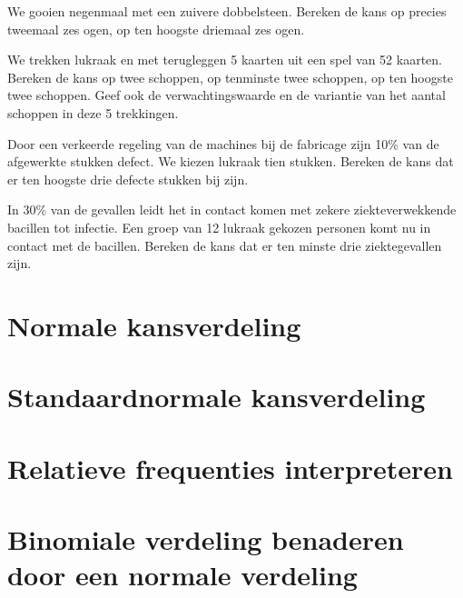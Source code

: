 \documentclass[12pt,twoside]{article}
\begin{document}
\begin{oefening}
We gooien negenmaal met een zuivere dobbelsteen. Bereken de kans op precies tweemaal zes ogen, op ten hoogste driemaal zes ogen.
\end{oefening}

\begin{oefening}
We trekken lukraak en met terugleggen 5 kaarten uit een spel van 52 kaarten. Bereken de kans op twee schoppen, op tenminste twee schoppen, op ten hoogste twee schoppen. Geef ook de verwachtingswaarde en de variantie van het aantal schoppen in deze 5 trekkingen.
\end{oefening}

\begin{oefening}
Door een verkeerde regeling van de machines bij de fabricage zijn 10\% van de afgewerkte stukken defect. We kiezen lukraak tien stukken. Bereken de kans dat er ten hoogste drie defecte stukken bij zijn.
\end{oefening}

\begin{oefening}
In 30\% van de gevallen leidt het in contact komen met zekere ziekteverwekkende bacillen tot infectie. Een groep van 12 lukraak gekozen personen komt nu in contact met de bacillen. Bereken de kans dat er ten minste drie ziektegevallen zijn.
\end{oefening}

\pagebreak
\section{Normale kansverdeling}

\section{Standaardnormale kansverdeling}

\section{Relatieve frequenties interpreteren}

\section{Binomiale verdeling benaderen door een normale verdeling}



\end{document}
